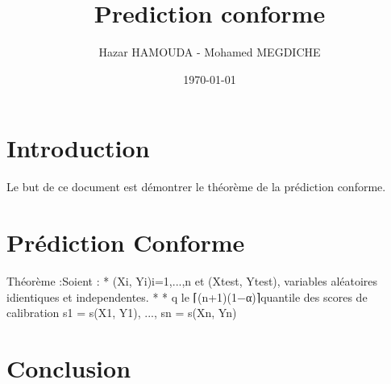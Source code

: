 \documentclass[a4paper,12pt]{article}%
\title{Prediction conforme}
\author{Hazar HAMOUDA - Mohamed MEGDICHE}
\date{\today}
\begin{document}
\maketitle

\section{Introduction}
Le but de ce document est démontrer le théorème de la prédiction conforme.
\section{Prédiction Conforme}
Théorème :Soient : 
 * (Xi, Yi)i=1,...,n et (Xtest, Ytest), variables aléatoires idientiques et independentes.
 *
 * q le ⌈(n+1)(1−α)⌉quantile des scores de calibration s1 = s(X1, Y1), ..., sn = s(Xn, Yn)
\section{Conclusion}
\end{document}
